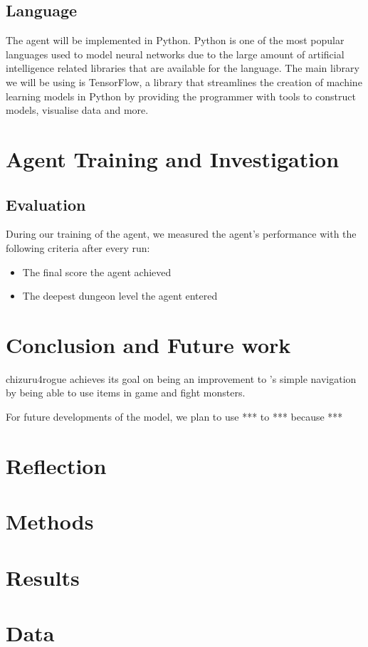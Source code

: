 \documentclass[11pt,a4paper]{article}
\begin{document}
    \subsection{Language}
    The agent will be implemented in Python. Python is one of the most popular languages used to model neural networks due to the large amount of artificial intelligence related libraries that are available for the language. The main library we will be using is TensorFlow, a library that streamlines the creation of machine learning models in Python by providing the programmer with tools to construct models, visualise data and more.


    \section{Agent Training and Investigation}
    \subsection{Evaluation}
    During our training of the agent, we measured the agent's performance with the following criteria after every run:
    \begin{itemize}
        \item The final score the agent achieved
        \item The deepest dungeon level the agent entered
    \end{itemize}

    \section{Conclusion and Future work}
    chizuru4rogue achieves its goal on being an improvement to \cite{asperti18}'s simple navigation by being able to use items in game and fight monsters.

    For future developments of the model, we plan to use *** to *** because ***

    \section{Reflection}

    \medskip

    
    

    \medskip

    \appendix
    \section{Methods}
    \section{Results}
    \section{Data}
\end{document}
